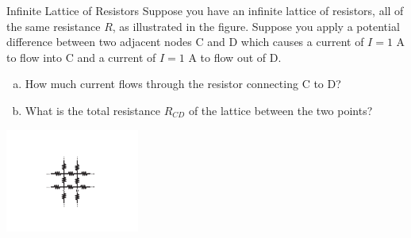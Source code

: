 \documentclass{esg8022pset}
\begin{document}
\begin{problem}{Infinite Lattice of Resistors}
  Suppose you have an infinite lattice of resistors, all of the same resistance $R$, as illustrated in the figure. Suppose you apply a potential difference between two adjacent nodes C and D which causes a current of $I = 1$ A to flow into C and a current of $I = 1$ A to flow out of D.
  \begin{enumerate}[(a)]
   \item How much current flows through the resistor connecting C to D?
   \item What is the total resistance $R_{CD}$ of the lattice between the two points?
  \end{enumerate}
  \begin{center}\includegraphics[width=0.33\textwidth]{ps06_09_01}\end{center}
\end{problem}
\begin{solution}

\end{solution}
\end{document}

